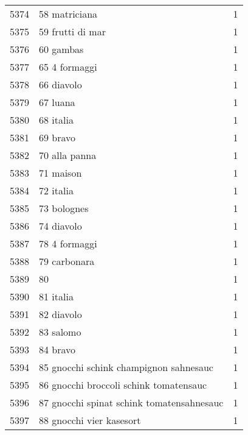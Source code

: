 \begin{tabular}{llr}
5374 &                                      58 matriciana &      1 \\
5375 &                                   59 frutti di mar &      1 \\
5376 &                                          60 gambas &      1 \\
5377 &                                      65 4 formaggi &      1 \\
5378 &                                         66 diavolo &      1 \\
5379 &                                           67 luana &      1 \\
5380 &                                          68 italia &      1 \\
5381 &                                           69 bravo &      1 \\
5382 &                                      70 alla panna &      1 \\
5383 &                                          71 maison &      1 \\
5384 &                                          72 italia &      1 \\
5385 &                                        73 bolognes &      1 \\
5386 &                                         74 diavolo &      1 \\
5387 &                                      78 4 formaggi &      1 \\
5388 &                                       79 carbonara &      1 \\
5389 &                                                 80 &      1 \\
5390 &                                          81 italia &      1 \\
5391 &                                         82 diavolo &      1 \\
5392 &                                          83 salomo &      1 \\
5393 &                                           84 bravo &      1 \\
5394 &             85 gnocchi schink champignon sahnesauc &      1 \\
5395 &             86 gnocchi broccoli schink tomatensauc &      1 \\
5396 &          87 gnocchi spinat schink tomatensahnesauc &      1 \\
5397 &                           88 gnocchi vier kasesort &      1 \\

\end{tabular}
